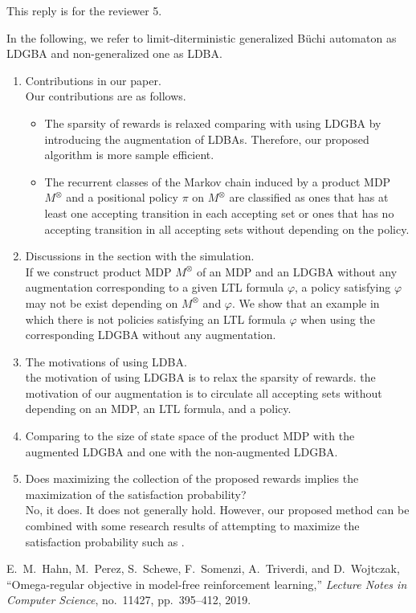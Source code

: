 \documentclass[10 pt, dvipdfmx]{article}
\theoremstyle{definition}
\begin{document}
This reply is for the reviewer 5.

In the following, we refer to limit-diterministic generalized B\"{u}chi automaton as LDGBA and non-generalized one as LDBA.

\begin{enumerate}
  \item Contributions in our paper. \\
  Our contributions are as follows.
  \begin{itemize}
    \item The sparsity of rewards is relaxed comparing with using LDGBA by introducing the augmentation of LDBAs. Therefore, our proposed algorithm is more sample efficient.
    \item The recurrent classes of the Markov chain induced by a product MDP $M^{\otimes}$ and a positional policy $\pi$ on $M^{\otimes}$ are classified as ones that has at least one accepting transition in each accepting set or ones that has no accepting transition in all accepting sets without depending on the policy.
  \end{itemize}

  \item Discussions in the section with the simulation. \\
  If we construct product MDP $M^{\otimes}$ of an MDP and an LDGBA without any augmentation corresponding to a given LTL formula $\varphi$, a policy satisfying $\varphi$ may not be exist depending on $M^{\otimes}$ and $\varphi$. We show that an example in which there is not policies satisfying an LTL formula $\varphi$ when using the corresponding LDGBA without any augmentation.

  \item The motivations of using LDBA. \\
  the motivation of using LDGBA is to relax the sparsity of rewards. the motivation of our augmentation is to circulate all accepting sets without depending on an MDP, an LTL formula, and a policy.

  \item Comparing to the size of state space of the product MDP with the augmented LDGBA and one with the non-augmented LDGBA. \\


  \item Does maximizing the collection of the proposed rewards implies the maximization of the satisfaction probability? \\
  No, it does. It does not generally hold. However, our proposed method can be combined with some research results of attempting to maximize the satisfaction probability such as \cite{Hahn2019}.
\end{enumerate}

\begin{thebibliography}{99}
E.\ M.\ Hahn, M.\ Perez, S.\ Schewe, F.\ Somenzi, A.\ Triverdi, and D.\ Wojtczak,
``Omega-regular objective in model-free reinforcement learning,''
\textit{Lecture Notes in Computer Science}, no.\ 11427, pp.\ 395--412, 2019.
\end{thebibliography}
\end{document}
